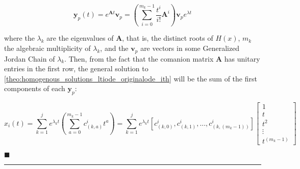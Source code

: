 \begin{equation} \mathbf{y}_p(t) =  e^{\mathbf{A}t} \mathbf{v}_p =  \left(\displaystyle\sum\limits_{i=0}^{m_k-1} \dfrac{t^i}{i!}\mathbf{A}^i\right)\mathbf{v}_p e^{\lambda t} \end{equation}

	where the $\lambda_k$ are the eigenvalues of $\mathbf{A}$, that is, the distinct roots of $H(x)$, $m_k$ the algebraic multiplicity of $\lambda_k$, and the $\mathbf{v}_p$ are vectors in some Generalized Jordan Chain of $\lambda_k$. Then, from the fact that the comanion matrix $\mathbf{A}$ has unitary entries in the first row, the general solution to \eqref{theo:homogenous_solutions_ltiode_originalode_ith} will be the sum of the first components of each $\mathbf{y}_p$:

\begin{equation} x_i(t) =  \sum\limits_{k=1}^j e^{\lambda_k t}\left(\displaystyle\sum\limits_{a=0}^{m_k-1} c_{(k,a)}^i t^a\right) = \sum\limits_{k=1}^j e^{\lambda_k t}\left[c_{(k,0)}^i,c_{(k,1)}^i,...,c_{(k,(m_k-1))}^{i}\right]\left[\begin{array}{c} 1 \\ t \\ t^2 \\ \vdots \\t^{(m_k-1)} \end{array}\right]  \end{equation}

%
\hfill$\blacksquare$
\vspace{5mm}
\hrule
\vspace{5mm}

